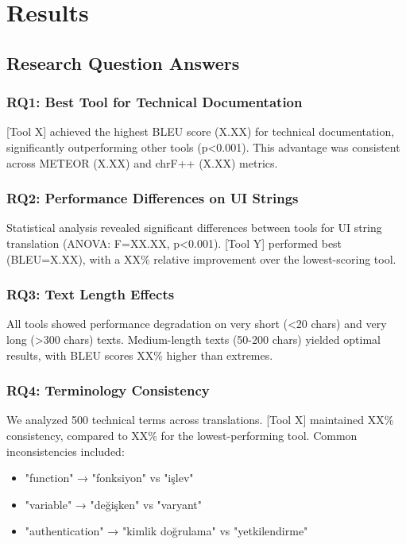 \section{Results}

\subsection{Research Question Answers}

\subsubsection{RQ1: Best Tool for Technical Documentation}

[Tool X] achieved the highest BLEU score (X.XX) for technical documentation, significantly outperforming other tools (p<0.001). This advantage was consistent across METEOR (X.XX) and chrF++ (X.XX) metrics.

\subsubsection{RQ2: Performance Differences on UI Strings}

Statistical analysis revealed significant differences between tools for UI string translation (ANOVA: F=XX.XX, p<0.001). [Tool Y] performed best (BLEU=X.XX), with a XX\% relative improvement over the lowest-scoring tool.

\subsubsection{RQ3: Text Length Effects}

All tools showed performance degradation on very short (<20 chars) and very long (>300 chars) texts. Medium-length texts (50-200 chars) yielded optimal results, with BLEU scores XX\% higher than extremes.

\subsubsection{RQ4: Terminology Consistency}

We analyzed 500 technical terms across translations. [Tool X] maintained XX\% consistency, compared to XX\% for the lowest-performing tool. Common inconsistencies included:
\begin{itemize}
    \item "function" → "fonksiyon" vs "işlev"
    \item "variable" → "değişken" vs "varyant"
    \item "authentication" → "kimlik doğrulama" vs "yetkilendirme"
\end{itemize}

